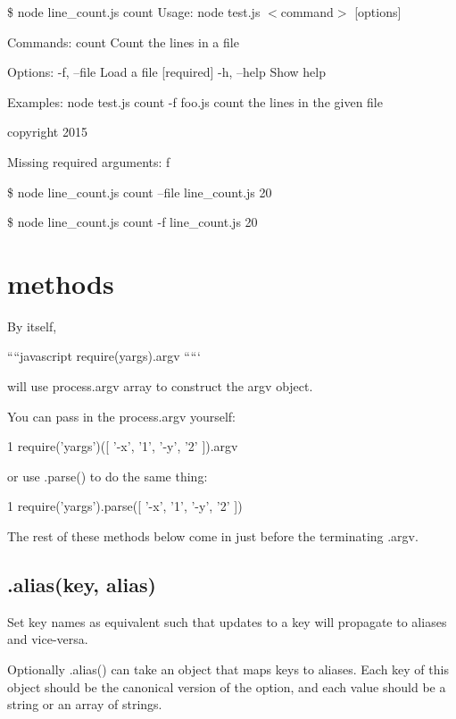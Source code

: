  \$ node line\+\_\+count.\+js count Usage\+: node test.\+js $<$command$>$ \mbox{[}options\mbox{]}

Commands\+: count Count the lines in a file

Options\+: -\/f, --file Load a file \mbox{[}required\mbox{]} -\/h, --help Show help

Examples\+: node test.\+js count -\/f foo.\+js count the lines in the given file

copyright 2015

Missing required arguments\+: f

\$ node line\+\_\+count.\+js count --file line\+\_\+count.\+js 20

\$ node line\+\_\+count.\+js count -\/f line\+\_\+count.\+js 20

\section*{methods }

By itself,

````javascript require(\textquotesingle{}yargs\textquotesingle{}).argv `````

will use {\ttfamily process.\+argv} array to construct the {\ttfamily argv} object.

You can pass in the {\ttfamily process.\+argv} yourself\+:


\begin{DoxyCode}
1 require('yargs')([ '-x', '1', '-y', '2' ]).argv
\end{DoxyCode}


or use .parse() to do the same thing\+:


\begin{DoxyCode}
1 require('yargs').parse([ '-x', '1', '-y', '2' ])
\end{DoxyCode}


The rest of these methods below come in just before the terminating {\ttfamily .argv}.

\subsection*{.alias(key, alias) }

Set key names as equivalent such that updates to a key will propagate to aliases and vice-\/versa.

Optionally {\ttfamily .alias()} can take an object that maps keys to aliases. Each key of this object should be the canonical version of the option, and each value should be a string or an array of strings.


